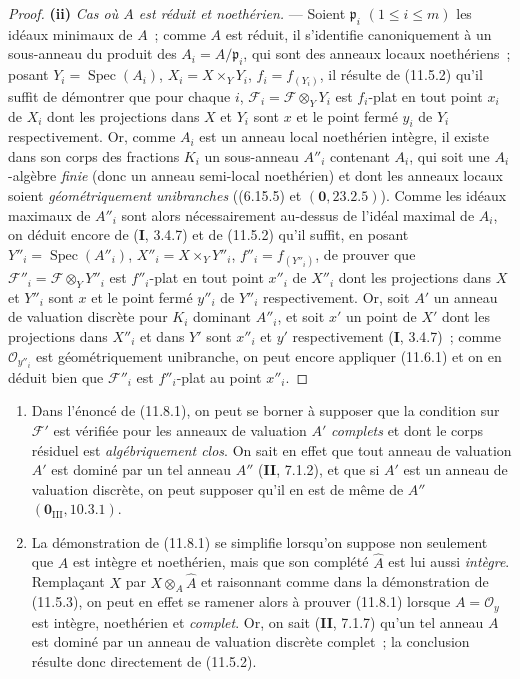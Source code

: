 \begin{proof}
\medskip
\noindent\textbf{(ii)} \emph{Cas où $A$ est réduit et noethérien.} --- Soient
$\mathfrak p_i$ $(1\leq i\leq m)$ les idéaux minimaux de $A$~; comme $A$ est
réduit, il s'identifie canoniquement à un sous-anneau du produit des
$A_i=A/\mathfrak p_i$, qui sont des anneaux locaux noethériens~; posant
$Y_i=\operatorname{Spec}(A_i)$, $X_i=X\times_Y Y_i$, $f_i=f_{(Y_i)}$, il
résulte de (11.5.2) qu'il suffit de démontrer que pour chaque $i$,
$\mathcal F_i=\mathcal F\otimes_Y Y_i$ est $f_i$-plat en tout point $x_i$ de
$X_i$ dont les projections dans $X$ et $Y_i$ sont $x$ et le point fermé $y_i$
de $Y_i$ respectivement. Or, comme $A_i$ est un anneau local noethérien intègre,
il existe dans son corps des fractions $K_i$ un sous-anneau $A''_i$ contenant
$A_i$, qui soit une $A_i$-algèbre \emph{finie} (donc un anneau semi-local
noethérien) et dont les anneaux locaux soient \emph{géométriquement
unibranches} ((6.15.5) et $(\mathbf 0,23.2.5)$). Comme les idéaux maximaux de
$A''_i$ sont alors nécessairement au-dessus de l'idéal maximal de $A_i$, on
déduit encore de (\textbf I, 3.4.7) et de (11.5.2) qu'il suffit, en posant
$Y''_i=\operatorname{Spec}(A''_i)$, $X''_i=X\times_Y Y''_i$,
$f''_i=f_{(Y''_i)}$, de prouver que
$\mathcal F''_i=\mathcal F\otimes_Y Y''_i$ est $f''_i$-plat en tout point
$x''_i$ de $X''_i$ dont les projections dans $X$ et $Y''_i$ sont $x$ et le
point fermé $y''_i$ de $Y''_i$ respectivement. Or, soit $A'$ un anneau de
valuation discrète pour $K_i$ dominant $A''_i$, et soit $x'$ un point de $X'$
dont les projections dans $X''_i$ et dans $Y'$ sont $x''_i$ et $y'$
respectivement (\textbf I, 3.4.7)~; comme $\mathcal O_{y''_i}$ est
géométriquement unibranche, on peut encore appliquer (11.6.1) et on en déduit
bien que $\mathcal F''_i$ est $f''_i$-plat au point $x''_i$.
\end{proof}

\begin{remarks}[11.8.2]
\label{IV.11.8.2-fr}
\begin{enumerate}[label=(\roman*)]
  \item Dans l'énoncé de (11.8.1), on peut se borner à supposer que la condition
  sur $\mathcal F'$ est vérifiée pour les anneaux de valuation $A'$ \emph{complets}
  et dont le corps résiduel est \emph{algébriquement clos}. On sait en effet que
  tout anneau de valuation $A'$ est dominé par un tel anneau $A''$
  (\textbf{II}, 7.1.2), et que si $A'$ est un anneau de valuation discrète, on
  peut supposer qu'il en est de même de $A''$
  $(\mathbf 0_{\mathrm{III}},10.3.1)$.
  \item La démonstration de (11.8.1) se simplifie lorsqu'on suppose non seulement
  que $A$ est intègre et noethérien, mais que son complété $\widehat A$ est lui
  aussi \emph{intègre}. Remplaçant $X$ par $X\otimes_A\widehat A$ et raisonnant
  comme dans la démonstration de (11.5.3), on peut en effet se ramener alors à
  prouver (11.8.1) lorsque $A=\mathcal O_y$ est intègre, noethérien et
  \emph{complet}. Or, on sait (\textbf{II}, 7.1.7) qu'un tel anneau $A$ est
  dominé par un anneau de valuation discrète complet~; la conclusion résulte
  donc directement de (11.5.2).
\end{enumerate}
\end{remarks}


